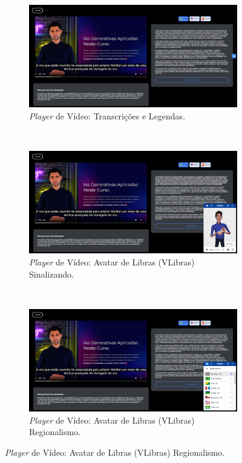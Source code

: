\begin{figure}[htbp]
\centering
\caption{\textit{Screenshots} da Demo do \textit{Player} de Vídeo.}
\label{fig:chapter4-cs2-poc-demo}
\begin{subfigure}[b]{0.83\textwidth}
\centering
\includegraphics[width=\textwidth]{images/chapter4-cs2-poc-demo1.png}
\caption{\textit{Player} de Vídeo: Transcrições e Legendas.}
\label{fig:chapter4-cs2-poc-demo1}
\end{subfigure} ~
\begin{subfigure}[b]{0.83\textwidth}
\centering
\includegraphics[width=\textwidth]{images/chapter4-cs2-poc-demo2.png}
\caption{\textit{Player} de Vídeo: Avatar de Libras (VLibras) Sinalizando.}
\label{fig:chapter4-cs2-poc-demo2}
\end{subfigure} ~
\begin{subfigure}[b]{0.83\textwidth}
\centering
\includegraphics[width=\textwidth]{images/chapter4-cs2-poc-demo3.png}
\caption{\textit{Player} de Vídeo: Avatar de Libras (VLibras) Regionalismo.}
\label{fig:chapter4-cs2-poc-demo3}
\end{subfigure}
\fautor
\end{figure}

